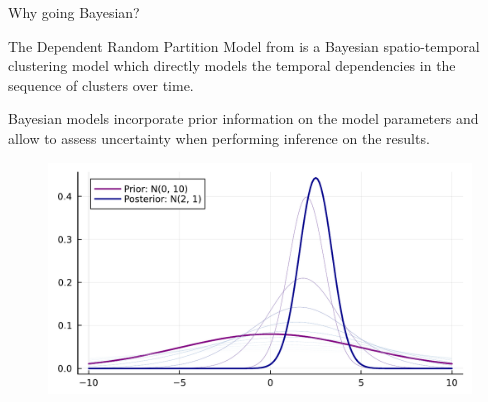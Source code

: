 \documentclass[
	11pt, %
 xcolor={dvipsnames,svgnames}
]{beamer}
\let\cite\citep
\begin{document}
\begin{frame}{Why going Bayesian?}

\begin{block}{}
The Dependent Random Partition Model from \cite{1-drpm} is a \alert{Bayesian} spatio-temporal clustering \alert{model} which directly models the temporal dependencies in the sequence of clusters over time.\\[6pt]
\end{block}
Bayesian models incorporate prior information on the model 
parameters and allow to assess uncertainty when performing inference on the results. 
\begin{figure}
    \centering
    \includegraphics[width=0.68\linewidth]{imgs/prior_post.pdf}
    \label{fig:enter-label}
\end{figure}
\end{frame}
\end{document}

